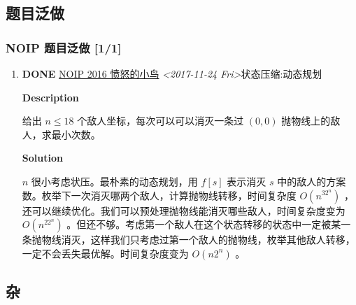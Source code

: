\documentclass[11pt]{article}
\begin{document}
\subsection{题目泛做}
\label{sec-2-1}
\subsubsection{NOIP 题目泛做 [1/1]}
\label{sec-2-1-1}
\begin{enumerate}
\item {\bfseries\sffamily DONE} \href{https://www.luogu.org/problemnew/show/2831}{NOIP 2016 愤怒的小鸟} \textit{<2017-11-24 Fri>}\hfill{}\textsc{状态压缩:动态规划}
\label{sec-2-1-1-1}

\textbf{Description}

给出 $n \leq 18$ 个敌人坐标，每次可以可以消灭一条过 $(0,0)$ 抛物线上的敌人，求最小次数。

\textbf{Solution}

$n$ 很小考虑状压。最朴素的动态规划，用 $f[s]$ 表示消灭 $s$ 中的敌人的方案数。枚举下一次消灭哪两个敌人，计算抛物线转移，时间复杂度 $O(n^32^n)$ ，还可以继续优化。我们可以预处理抛物线能消灭哪些敌人，时间复杂度变为 $O(n^22^n)$ 。但还不够。考虑第一个敌人在这个状态转移的状态中一定被某一条抛物线消灭，这样我们只考虑过第一个敌人的抛物线，枚举其他敌人转移，一定不会丢失最优解。时间复杂度变为 $O(n2^n)$ 。
\end{enumerate}

\subsection{杂}
\label{sec-2-2}
\end{document}

